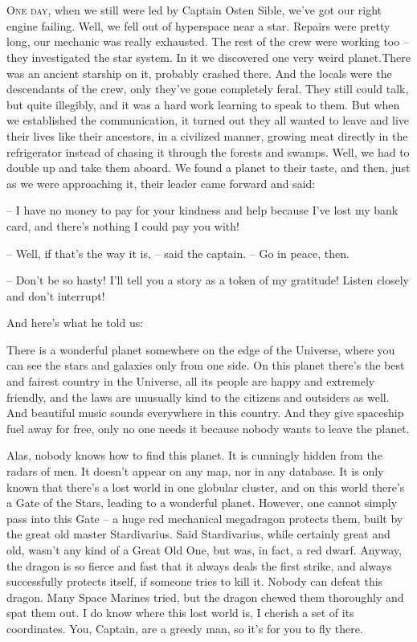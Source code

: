\documentclass[ebook,oneside,final,openright]{memoir}
\begin{document}
\chapter{}
\par
\lettrine{O}{ne day,} when we still were led by Captain Osten Sible, we’ve got our right engine failing. Well, we fell out of hyperspace near a star. Repairs were pretty long, our mechanic was really exhausted. The rest of the crew were working too – they investigated the star system. In it we discovered one very weird planet.There was an ancient starship on it, probably crashed there. And the locals were the descendants of the crew, only they’ve gone completely feral. They still could talk, but quite illegibly, and it was a hard work learning to speak to them. But when we established the communication, it turned out they all wanted to leave and live their lives like their ancestors, in a civilized manner, growing meat directly in the refrigerator instead of chasing it through the forests and swamps. Well, we had to double up and take them aboard. We found a planet to their taste, and then, just as we were approaching it, their leader came forward and said: \par
\par
– I have no money to pay for your kindness and help because I’ve lost my bank card, and there’s nothing I could pay you with!\par
– Well, if that’s the way it is, – said the captain. – Go in peace, then. \par
– Don’t be so hasty! I’ll tell you a story as a token of my gratitude! Listen closely and don’t interrupt! \par
 And here’s what he told us:\par
\par
 There is a wonderful planet somewhere on the edge of the Universe, where you can see the stars and galaxies only from one side. On this planet there’s the best and fairest country in the Universe, all its people are happy and extremely friendly, and the laws are unusually kind to the citizens and outsiders as well. And beautiful music sounds everywhere in this country. And they give spaceship fuel away for free, only no one needs it because nobody wants to leave the planet. \par
Alas, nobody knows how to find this planet. It is cunningly hidden from the radars of men. It doesn’t appear on any map, nor in any database. It is only known that there’s a lost world in one globular cluster, and on this world there’s a Gate of the Stars, leading to a wonderful planet. However, one cannot simply pass into this Gate – a huge red mechanical megadragon protects them, built by the great old master Stardivarius. Said Stardivarius, while certainly great and old, wasn’t any kind of a Great Old One, but was, in fact, a red dwarf. Anyway, the dragon is so fierce and fast that it always deals the first strike, and always successfully protects itself, if someone tries to kill it. Nobody can defeat this dragon. Many Space Marines tried, but the dragon chewed them thoroughly and spat them out. I do know where this lost world is, I cherish a set of its coordinates. You, Captain, are a greedy man, so it’s for you to fly there.\par
\end{document}
